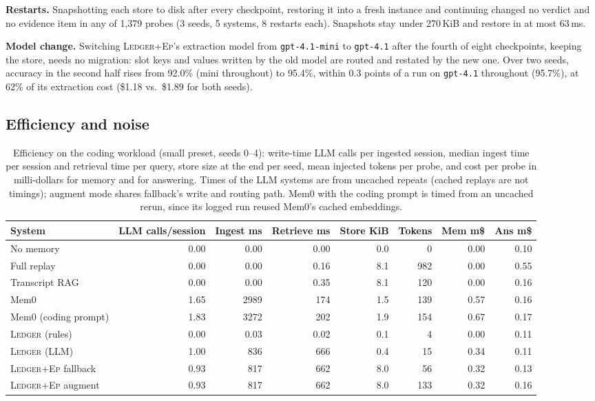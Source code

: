 \documentclass[10pt,conference]{IEEEtran}
\newcommand{\sys}{\textsc{Ledger}}
\newcommand{\hyb}{\textsc{Ledger+Ep}}
\begin{document}
\textbf{Restarts.} Snapshotting each store to disk after every checkpoint,
restoring it into a fresh instance and continuing changed no verdict and no
evidence item in any of 1{,}379 probes (3 seeds, 5 systems, 8 restarts each).
Snapshots stay under 270\,KiB and restore in at most 63\,ms.

\textbf{Model change.} Switching \hyb{}'s extraction model from
\texttt{gpt-4.1-mini} to \texttt{gpt-4.1} after the fourth of eight
checkpoints, keeping the store, needs no migration: slot keys and values
written by the old model are routed and restated by the new one. Over two
seeds, accuracy in the second half rises from 92.0\% (mini throughout) to
95.4\%, within 0.3 points of a run on \texttt{gpt-4.1} throughout (95.7\%),
at 62\% of its extraction cost (\$1.18 vs.\ \$1.89 for both seeds).

\subsection{Efficiency and noise}

\begin{table}[t]
\caption{Efficiency on the coding workload (small preset, seeds 0--4):
write-time LLM calls per ingested session, median ingest time per session and
retrieval time per query, store size at the end per seed, mean injected tokens
per probe, and cost per probe in milli-dollars for memory and for answering.
Times of the LLM systems are from uncached repeats (cached replays are not
timings); augment mode shares fallback's write and routing path. Mem0 with the
coding prompt is timed from an uncached rerun, since its logged run reused Mem0's cached embeddings.}
\label{tab:efficiency}
\centering
\footnotesize
\begin{tabular}{@{}lrrrrrrr@{}}
\toprule
System & LLM calls/session & Ingest ms & Retrieve ms & Store KiB & Tokens & Mem m\$ & Ans m\$ \\
\midrule
No memory & 0.00 & 0.00 & 0.00 & 0.0 & 0 & 0.00 & 0.10 \\
Full replay & 0.00 & 0.00 & 0.16 & 8.1 & 982 & 0.00 & 0.55 \\
Transcript RAG & 0.00 & 0.00 & 0.35 & 8.1 & 120 & 0.00 & 0.16 \\
Mem0 & 1.65 & 2989 & 174 & 1.5 & 139 & 0.57 & 0.16 \\
Mem0 (coding prompt) & 1.83 & 3272 & 202 & 1.9 & 154 & 0.67 & 0.17 \\
\sys{} (rules) & 0.00 & 0.03 & 0.02 & 0.1 & 4 & 0.00 & 0.11 \\
\sys{} (LLM) & 1.00 & 836 & 666 & 0.4 & 15 & 0.34 & 0.11 \\
\hyb{} fallback & 0.93 & 817 & 662 & 8.0 & 56 & 0.32 & 0.13 \\
\hyb{} augment & 0.93 & 817 & 662 & 8.0 & 133 & 0.32 & 0.16 \\
\bottomrule
\end{tabular}
\end{table}
\end{document}
